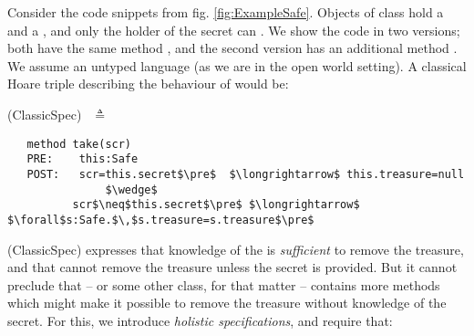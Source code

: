 Consider the code snippets from fig. \ref{fig:ExampleSafe}. Objects of
 class   hold a  and a , and  only
 the holder of the secret can  .
%
 We show the code in two versions; both   have the same method , and the second version 
 has an additional method .
  We 
 assume an untyped language (as we are in the open world setting).
 A classical Hoare triple describing the behaviour of  would be:
 
  \vspace{.1in}
  
(ClassicSpec)$  \ \ $  $\triangleq$
\vspace{-.1in}
\begin{lstlisting}
   method take(scr)
   PRE:    this:Safe  
   POST:   scr=this.secret$\pre$  $\longrightarrow$ this.treasure=null 
               $\wedge$
          scr$\neq$this.secret$\pre$ $\longrightarrow$  $\forall$s:Safe.$\,$s.treasure=s.treasure$\pre$
 \end{lstlisting}
\vspace{-.2in}

(ClassicSpec)  expresses  that knowledge of the  is  \emph{sufficient} %
to remove the treasure, and that  %
%
  cannot remove the treasure unless the secret is
provided. 
%
But it cannot preclude that  -- or some other class, for that matter -- contains more methods 
which might make it possible to remove the treasure  without knowledge of the
secret. For this, we introduce \emph{holistic specifications}, and require that:
 
